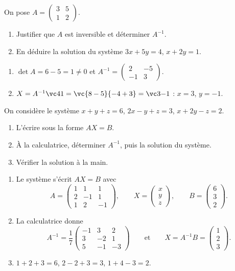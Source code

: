 \begin{exercise}
On pose $A=\begin{pmatrix}3&5\\1&2\end{pmatrix}$.
\begin{enumerate}
\item Justifier que $A$ est inversible et déterminer $A^{-1}$.
\item En déduire la solution du système $3x+5y=4$, $x+2y=1$.
\end{enumerate}
\end{exercise}
\begin{solution}
\begin{enumerate}
\item $\det A=6-5=1\neq0$ et $A^{-1}=\begin{pmatrix}2&-5\\-1&3\end{pmatrix}$.
\item $X=A^{-1}\vc41=\vc{8-5}{-4+3}=\vc3{-1}$ : $x=3$, $y=-1$.
\end{enumerate}
\end{solution}

\begin{exercise}
On considère le système $x+y+z=6$, $2x-y+z=3$, $x+2y-z=2$.
\begin{enumerate}
\item L'écrire sous la forme $AX=B$.
\item À la calculatrice, déterminer $A^{-1}$, puis la solution du système.
\item Vérifier la solution à la main.
\end{enumerate}
\end{exercise}
\begin{solution}
\begin{enumerate}
\item Le système s'écrit $AX=B$ avec \[A=\begin{pmatrix}1&1&1\\2&-1&1\\1&2&-1\end{pmatrix},\qquad X=\begin{pmatrix}x\\y\\z\end{pmatrix},\qquad B=\begin{pmatrix}6\\3\\2\end{pmatrix}.\]
\item La calculatrice donne \[A^{-1}=\frac17\begin{pmatrix}-1&3&2\\3&-2&1\\5&-1&-3\end{pmatrix}\qquad\text{et}\qquad X=A^{-1}B=\begin{pmatrix}1\\2\\3\end{pmatrix}.\]
\item $1+2+3=6$, $2-2+3=3$, $1+4-3=2$.
\end{enumerate}
\end{solution}

